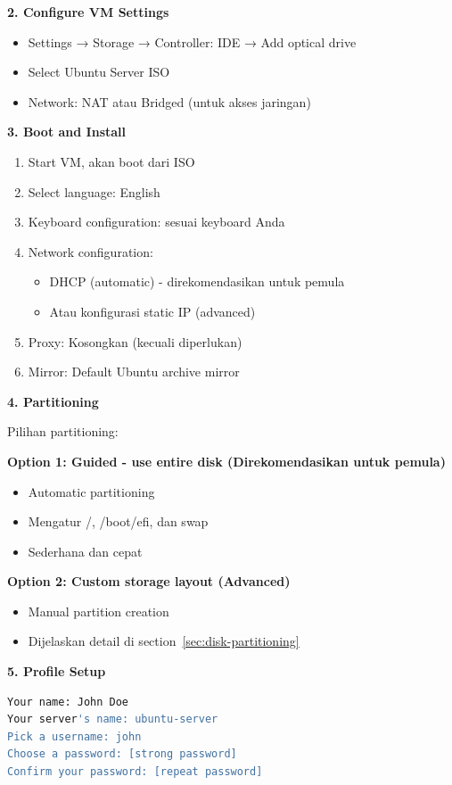 \textbf{2. Configure VM Settings}

\begin{itemize}
    \item Settings → Storage → Controller: IDE → Add optical drive
    \item Select Ubuntu Server ISO
    \item Network: NAT atau Bridged (untuk akses jaringan)
\end{itemize}

\textbf{3. Boot and Install}

\begin{enumerate}
    \item Start VM, akan boot dari ISO
    \item Select language: English
    \item Keyboard configuration: sesuai keyboard Anda
    \item Network configuration:
    \begin{itemize}
        \item DHCP (automatic) - direkomendasikan untuk pemula
        \item Atau konfigurasi static IP (advanced)
    \end{itemize}
    \item Proxy: Kosongkan (kecuali diperlukan)
    \item Mirror: Default Ubuntu archive mirror
\end{enumerate}

\textbf{4. Partitioning}

Pilihan partitioning:

\textbf{Option 1: Guided - use entire disk (Direkomendasikan untuk pemula)}
\begin{itemize}
    \item Automatic partitioning
    \item Mengatur /, /boot/efi, dan swap
    \item Sederhana dan cepat
\end{itemize}

\textbf{Option 2: Custom storage layout (Advanced)}
\begin{itemize}
    \item Manual partition creation
    \item Dijelaskan detail di section~\ref{sec:disk-partitioning}
\end{itemize}

\textbf{5. Profile Setup}

\begin{lstlisting}[language=bash, caption={User account information}]
Your name: John Doe
Your server's name: ubuntu-server
Pick a username: john
Choose a password: [strong password]
Confirm your password: [repeat password]
\end{lstlisting}

